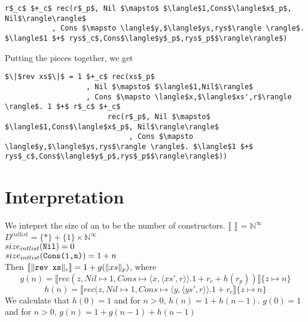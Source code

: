 %
\begin{lstlisting}
r$_c$ $+_c$ rec(r$_p$, Nil $\mapsto$ $\langle$1,Cons$\langle$x$_p$, Nil$\rangle\rangle$
           , Cons $\mapsto \langle$y,$\langle$ys,rys$\rangle \rangle$. $\langle$1 $+$ rys$_c$,Cons$\langle$y$_p$,rys$_p$$\rangle\rangle$)
\end{lstlisting}
%
Putting the pieces together, we get
%
\begin{lstlisting}[frame=single]
$\|$rev xs$\|$ = 1 $+_c$ rec(xs$_p$
                   , Nil $\mapsto$ $\langle$1,Nil$\rangle$
                   , Cons $\mapsto \langle$x,$\langle$xs',r$\rangle \rangle$. 1 $+$ r$_c$ $+_c$
                        rec(r$_p$, Nil $\mapsto$ $\langle$1,Cons$\langle$x$_p$, Nil$\rangle\rangle$
                             , Cons $\mapsto \langle$y,$\langle$ys,rys$\rangle \rangle$. $\langle$1 $+$ rys$_c$,Cons$\langle$y$_p$,rys$_p$$\rangle\rangle$))
\end{lstlisting}
%
%
%
\section{Interpretation}
%
We intepret the size of an  to be the number of constructors.
%
$\llbracket$  $\rrbracket$ = $\mathbb{N}^\infty$\\
$D^{intlist} = \{\ast\} + \{1\} \times \mathbb{N}^\infty$\\
$size_{intlist}(\texttt{Nil}) = 0$\\
$size_{intlist}(\texttt{Cons(1,n)}) = 1 + n$\\
%
Then $\llbracket \| \texttt{rev xs} \|_c \rrbracket = 1 + g(\|xs\|_p)$, where
\[g(n) = \llbracket rec(z, Nil \mapsto 1, Cons \mapsto \langle x, \langle xs',r\rangle \rangle.1 + r_c + h(r_p))\rrbracket \{z \mapsto n\}\]
\[h(n) = \llbracket rec(z, Nil \mapsto 1, Cons \mapsto \langle y, \langle ys',r\rangle \rangle.1 + r_c \rrbracket \{z \mapsto n\}\]
%
We calculate that $h(0)=1$ and for $n > 0$, $h(n) = 1 + h(n-1)$.
$g(0) = 1$ and for $n > 0$, $g(n) = 1 + g(n-1) + h(n-1)$
